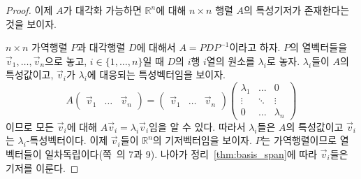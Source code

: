 \documentclass[sections/engineering_mathematics_lecture_note.tex]{subfiles}
\begin{document}
\begin{proof}
    이제 $A$가 대각화 가능하면 $\mathbb R^n$에 대해 $n \times n$ 행렬 $A$의 특성기저가 존재한다는 것을 보이자.

    $n \times n$ 가역행렬 $P$과 대각행렬 $D$에 대해서 $A = PDP^{-1}$이라고 하자.
    $P$의 열벡터들을 $\vec v_1, \dots, \vec v_n$으로 놓고, $i \in \{1, \dots, n\}$일 때 $D$의 $i$행 $i$열의 원소를 $\lambda_i$로 놓자.
    $\lambda_i$들이 $A$의 특성값이고, $\vec v_i$가 $\lambda_i$에 대응되는 특성벡터임을 보이자.
    \begin{equation*}
        A
        \begin{pmatrix}
            \vec v_1 & \dots & \vec v_n
        \end{pmatrix}
        =
        \begin{pmatrix}
            \vec v_1 & \dots & \vec v_n
        \end{pmatrix}
        \begin{pmatrix}
            \lambda_1 & \dots & 0\\
            \vdots & \ddots & \vdots\\
            0 & \dots & \lambda_n
        \end{pmatrix}
    \end{equation*}
    이므로 모든 $\vec v_i$에 대해 $A \vec v_i = \lambda_i \vec v_i$임을 알 수 있다.
    따라서 $\lambda_i$들은 $A$의 특성값이고 $\vec v_i$는 $\lambda_i$-특성벡터이다.
    이제 $\vec v_i$들이 $\mathbb R^n$의 기저벡터임을 보이자.
    $P$는 가역행렬이므로 열벡터들이 일차독립이다(쪽~\pageref{page:equiv_remark_update}의 7과 9).
    나아가 정리~\ref{thm:basis_span}에 따라 $\vec v_i$들은 기저를 이룬다.
\end{proof}
\end{document}
